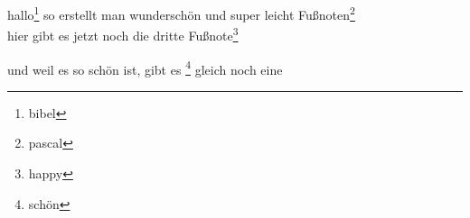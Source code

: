 \documentclass[
  captions=tableheading,
  bibliography=totoc,
]{scrartcl}
\begin{document}
  hallo\footnote{bibel}
  so erstellt man wunderschön und super leicht Fußnoten\footnote{pascal} \\
  hier gibt es jetzt noch die dritte Fußnote\footnote{happy}

  und weil es so schön ist, gibt es \footnote{schön} gleich noch eine
\end{document}
